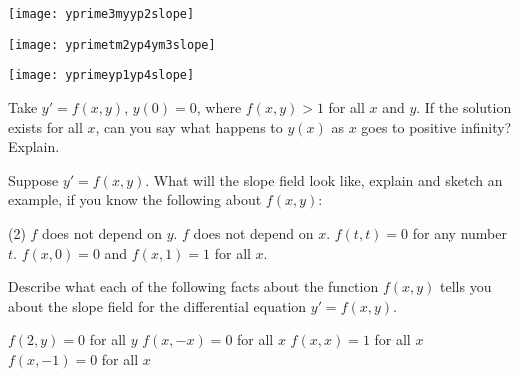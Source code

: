\documentclass{ximera}
\begin{document}
\begin{minipage}{0.32\textwidth}
    \texttt{[image: yprime3myyp2slope]}
\end{minipage}%
\begin{minipage}{0.32\textwidth}
    \texttt{[image: yprimetm2yp4ym3slope]}
\end{minipage}%
\begin{minipage}{0.32\textwidth}
    \texttt{[image: yprimeyp1yp4slope]}
\end{minipage}

\begin{exercise}[challenging]
    Take $y' = f(x,y)$, $y(0) = 0$, where $f(x,y) > 1$ for all $x$ and $y$.  If the solution exists for all $x$, can you say what happens to $y(x)$ as $x$ goes to positive infinity?  Explain.
\end{exercise}

\begin{exercise}
    Suppose $y' = f(x,y)$.  What will the slope field look like, explain and sketch an example, if you know the following about $f(x,y)$:
    \begin{tasks}(2)
        \task $f$ does not depend on $y$.
        \task $f$ does not depend on $x$.
        \task $f(t,t) = 0$ for any number $t$.
        \task $f(x,0) = 0$ and $f(x,1) = 1$ for all $x$.
    \end{tasks}
\end{exercise}

\begin{exercise}
    Describe what each of the following facts about the function $f(x,y)$ tells you about the slope field for the differential equation $y' = f(x,y)$.
    \begin{tasks}
        \task $f(2,y) = 0$ for all $y$
        \task $f(x,-x) = 0$ for all $x$
        \task $f(x,x) = 1$ for all $x$
        \task $f(x, -1) = 0$ for all $x$
    \end{tasks}
\end{exercise}

\end{document}
